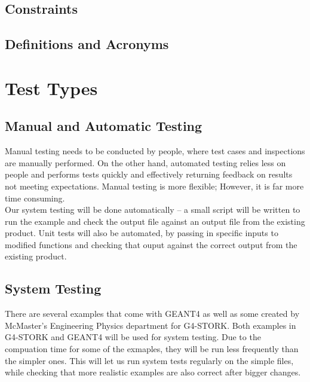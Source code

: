 \documentclass[12pt]{article}
\begin{document}
\subsection{Constraints} %

\subsection{Definitions and Acronyms} %

\section{Test Types}

\subsection{Manual and Automatic Testing} %
Manual testing needs to be conducted by people, where test cases and inspections are manually performed. On the other hand, automated testing relies less on people and performs tests quickly and effectively returning feedback on results not meeting expectations. Manual testing is more flexible; However, it is far more time consuming.\\

Our system testing will be done automatically -- a small script will be written to run the example and check the output file against an output file from the existing product. Unit tests will also be automated, by passing in specific inputs to modified functions and checking that ouput against the correct output from the existing product.\\ 

\subsection{System Testing} %
There are several examples that come with GEANT4 as well as some created by McMaster's Engineering Physics department for G4-STORK. Both examples in G4-STORK and GEANT4 will be used for system testing. Due to the compuation time for some of the exmaples, they will be run less frequently than the simpler ones. This will let us run system tests regularly on the simple files, while checking that more realistic examples are also correct after bigger changes.\\
\end{document}
